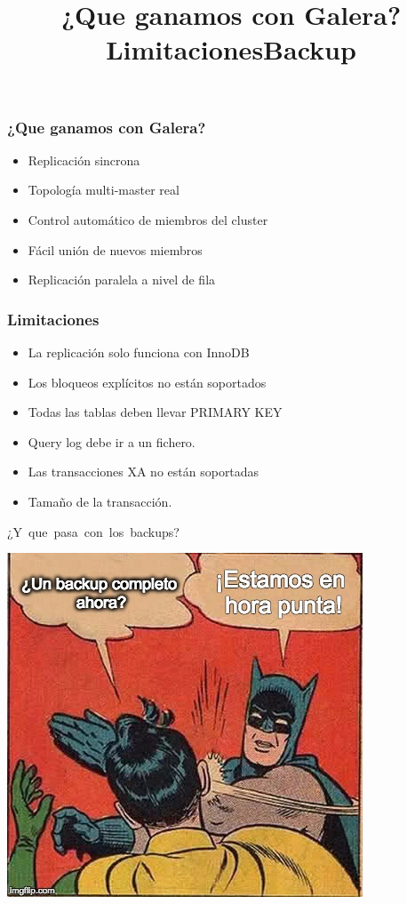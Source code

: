 \documentclass[UTF8]{beamer}
\begin{document}
\title{¿Que ganamos con Galera?}
\begin{frame}
	\frametitle{¿Que ganamos con Galera?}
	\begin{itemize}
		\item Replicación sincrona
		\pause
		\item Topología multi-master real
		\pause
		\item Control automático de miembros del cluster
		\pause
		\item Fácil unión de nuevos miembros
		\pause
		\item Replicación paralela a nivel de fila
	\end{itemize}
\end{frame}



\title[Limitaciones]{Limitaciones}
\begin{frame}
	\frametitle[Limitaciones]{Limitaciones}
	\begin{itemize}
		\item La replicación solo funciona con InnoDB
		\pause
		\item Los bloqueos explícitos no están soportados
		\pause
		\item Todas las tablas deben llevar PRIMARY KEY
		\pause
		\item Query log debe ir a un fichero.
		\pause
		\item Las transacciones XA no están soportadas
		\pause
		\item Tamaño de la transacción.
	\end{itemize}
\end{frame}


\title[Backup]{Backup}

\begin{frame}
	\centering
	\mbox{¿Y que pasa con los backups?}	
\end{frame}

\begin{frame}
	\centering
	\includegraphics[width=\textwidth,height=\textheight,keepaspectratio]{necesitas_backup}
\end{frame}
\end{document}
